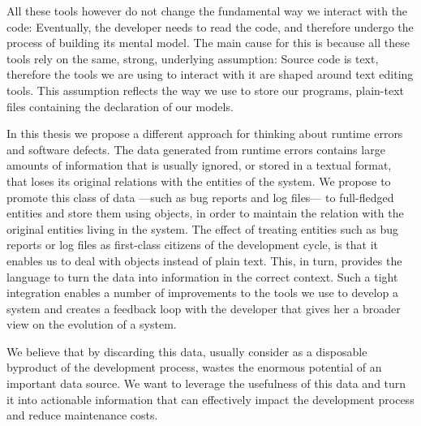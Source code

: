 All these tools however do not change the fundamental way we interact with the code: Eventually, the developer needs to read the code, and therefore undergo the process of building its mental model.
The main cause for this is because all these tools rely on the same, strong, underlying assumption: Source code is text, therefore the tools we are using to interact with it are shaped around text editing tools.
This assumption reflects the way we use to store our programs, \ie plain-text files containing the declaration of our models.


In this thesis we propose a different approach for thinking about runtime errors and software defects.
The data generated from runtime errors contains large amounts of information that is usually ignored, or stored in a textual format, that loses its original relations with the entities of the system.
We propose to promote this class of data ---such as bug reports and log files--- to full-fledged entities and store them using objects, in order to maintain the relation with the original entities living in the system.
The effect of treating entities such as bug reports or log files as first-class citizens of the development cycle, is that it enables us to deal with objects instead of plain text.
This, in turn, provides the language to turn the data into information in the correct context.
Such a tight integration enables a number of improvements to the tools we use to develop a system and creates a feedback loop with the developer that gives her a broader view on the evolution of a system.

We believe that by discarding this data, usually consider as a disposable byproduct of the development process, wastes the enormous potential of an important data source.
We want to leverage the usefulness of this data and turn it into actionable information that can effectively impact the development process and reduce maintenance costs.

